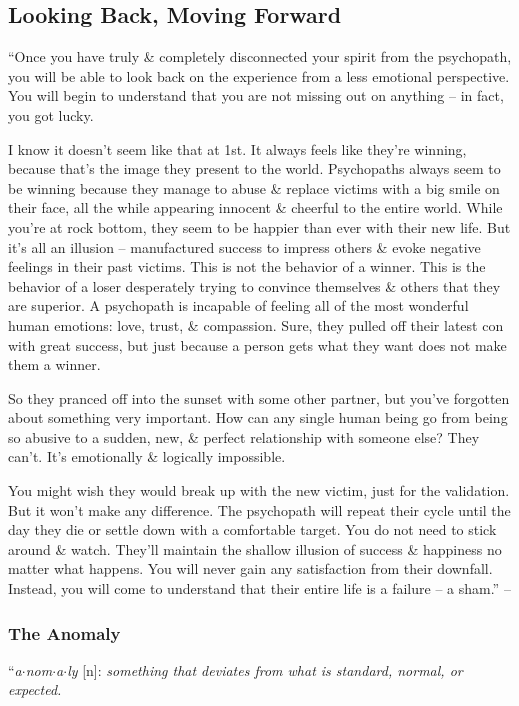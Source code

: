 \documentclass{article}
\numberwithin{equation}{section}
\begin{document}
\subsection{Looking Back, Moving Forward}
``Once you have truly \& completely disconnected your spirit from the psychopath, you will be able to look back on the experience from a less emotional perspective. You will begin to understand that you are not missing out on anything -- in fact, you got lucky.

I know it doesn't seem like that at 1st. It always feels like they're winning, because that's the image they present to the world. Psychopaths always seem to be winning because they manage to abuse \& replace victims with a big smile on their face, all the while appearing innocent \& cheerful to the entire world. While you're at rock bottom, they seem to be happier than ever with their new life. But it's all an illusion -- manufactured success to impress others \& evoke negative feelings in their past victims. This is not the behavior of a winner. This is the behavior of a loser desperately trying to convince themselves \& others that they are superior. A psychopath is incapable of feeling all of the most wonderful human emotions: love, trust, \& compassion. Sure, they pulled off their latest con with great success, but just because a person gets what they want does not make them a winner.

So they pranced off into the sunset with some other partner, but you've forgotten about something very important. How can any single human being go from being so abusive to a sudden, new, \& perfect relationship with someone else? They can't. It's emotionally \& logically impossible.

You might wish they would break up with the new victim, just for the validation. But it won't make any difference. The psychopath will repeat their cycle until the day they die or settle down with a comfortable target. You do not need to stick around \& watch. They'll maintain the shallow illusion of success \& happiness no matter what happens. You will never gain any satisfaction from their downfall. Instead, you will come to understand that their entire life is a failure -- a sham.'' -- \cite[pp. 142--143]{MacKenzie2015}

\subsubsection{The Anomaly}
``\textit{a$\cdot$nom$\cdot$a$\cdot$ly} [n]: \textit{something that deviates from what is standard, normal, or expected.}
\end{document}
